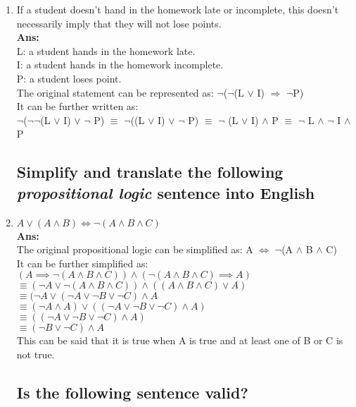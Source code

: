\documentclass[12pt]{article}
\begin{document}
\begin{enumerate}
\item{If a student doesn't hand in the homework late or incomplete, this doesn't necessarily imply that they will not lose points.}\\
\textbf{Ans:}\\
L: a student hands in the homework late.\\
I: a student hands in the homework incomplete.\\
P: a student loses point.\\
The original statement can be represented as: $\neg$($\neg$(L $\vee$ I) $\Rightarrow$ $\neg$P)\\
It can be further written as:\\
$\neg$($\neg\neg$(L $\vee$ I) $\vee$ $\neg$ P) $\equiv$ $\neg$((L $\vee$ I) $\vee$ $\neg$ P) $\equiv$ $\neg$ (L $\vee$ I) $\wedge$ P $\equiv$ $\neg$ L $\wedge$ $\neg$ I $\wedge$ P


\subsection*{Simplify and translate the following \emph{propositional logic} sentence into English}

\item{\(A \lor (A \land B) \iff \lnot(A \land B \land C)\)}\\
\textbf{Ans:}\\
The original propositional logic can be simplified as: A $\iff$ $\lnot$(A $\land$ B $\land$ C)\\
It can be further simplified as:\\
\( (A \implies \lnot(A \land B \land C)) \land (\lnot(A \land B \land C) \implies A)   \)\\
\(\equiv (\lnot A \lor \lnot(A \land B \land C)) \land ((A \land B \land C) \lor A)    \)\\
\(\equiv (\lnot A \lor (\lnot A \lor \lnot B \lor \lnot C) \land A                     \)\\
\(\equiv (\lnot A \land A) \lor ((\lnot A \lor \lnot B \lor \lnot C) \land A)          \)\\
\(\equiv  ((\lnot A \lor \lnot B \lor \lnot C) \land A) \)\\
\(\equiv (\lnot B \lor \lnot C) \land A\)\\
This can be said that it is true when A is true and at least one of B or C is not true.\\


\subsection*{Is the following sentence valid?}


\end{enumerate}
\end{document}
